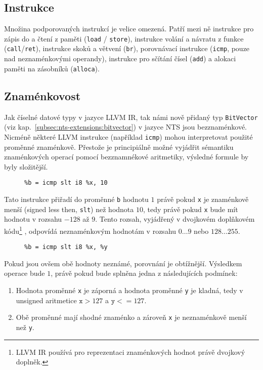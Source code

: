 \documentclass[12pt]{fithesis2}
\begin{document}
\subsection{Instrukce}
Množina podporovaných instrukcí je velice omezená. Patří mezi ně instrukce pro zápis do a čtení z paměti (\texttt{load} / \texttt{store}), instrukce volání a návratu z funkce (\texttt{call}/\texttt{ret}), instrukce skoků a větvení (\texttt{br}), porovnávací instrukce (\texttt{icmp}, pouze nad neznaménkovými operandy), instrukce pro sčítání čísel (\texttt{add}) a alokaci paměti na zásobníků (\texttt{alloca}).

\subsection{Znaménkovost}
Jak číselné datové typy v jazyce LLVM IR, tak námi nově přidaný typ \texttt{BitVector} (viz kap.~\ref{subsec:nts-extensions:bitvector}) v jazyce NTS jsou bezznaménkové. Nicméně některé LLVM instrukce (například \texttt{icmp}) mohou interpretovat použité proměnné znaménkově. Přestože je principiálně možné vyjádřit sémantiku znaménkových operací pomocí bezznamnékové aritmetiky, výsledné formule by byly složitější.
\begin{figure}[h!]
\begin{lstlisting}
%b = icmp slt i8 %x, 10
\end{lstlisting}
\end{figure}
Tato instrukce přiřadí do proměnné \texttt{b} hodnotu $1$ právě pokud \texttt{x} je znaménkově menší (signed less then, \texttt{slt}) než hodnota $10$, tedy právě pokud \texttt{x} bude mít hodnotu v rozsahu $-128$ až $9$. Tento rozsah, vyjádřený v dvojkovém doplňkovém kódu\footnote{LLVM IR používá pro reprezentaci znaménkových hodnot právě dvojkový doplněk.} , odpovídá neznaménkovým hodnotám v rozsahu $0 \ldots 9$ nebo $128 \ldots 255$. 

\begin{figure}[h!]
\begin{lstlisting}
%b = icmp slt i8 %x, %y
\end{lstlisting}
\end{figure}

Pokud jsou ovšem obě hodnoty neznámé, porovnání je obtížnější. Výsledkem operace bude $1$, právě pokud bude splněna jedna z následujících podmínek:
\begin{enumerate}
\item Hodnota proměnné \texttt{x} je záporná a hodnota proměnné \texttt{y} je kladná, tedy v unsigned aritmetice $\texttt{x} > 127$ a $\texttt{y} <= 127$.
\item Obě proměnné mají shodné znaménko a zároveň \texttt{x} je neznaménkově menší než \texttt{y}.
\end{enumerate}
\end{document}
